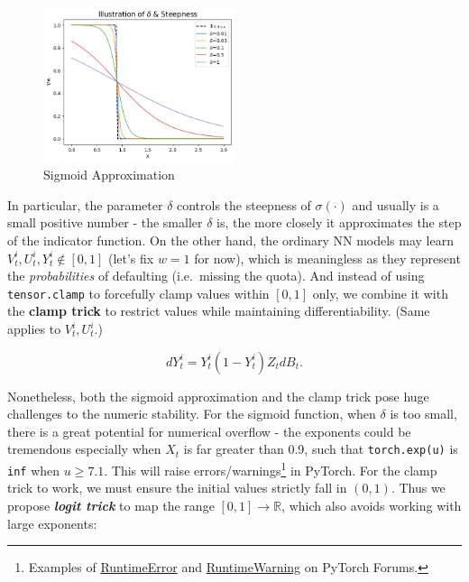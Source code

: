 \documentclass[a4paper,10pt]{article}
\newcommand{\1}{\mathbf{1}}
\begin{document}
\begin{figure}[ht]
    \centering
    \includegraphics[width=0.5\textwidth]{FinalReports/Illustration_diagrams/SigmoidApprox.png}
    \caption{Sigmoid Approximation}
    \label{fig:sig-approx}
\end{figure}

In particular, the parameter \(\delta\) controls the steepness of
\(\sigma(\cdot)\) and usually is a small positive number - the smaller
\(\delta\) is, the more closely it approximates the step of the indicator
function. On the other hand, the ordinary NN models may learn
\(V_t^i,U_t^i,Y_t^i \notin [0,1]\) (let's fix \(w=1\) for now), which is
meaningless as they represent the \emph{probabilities} of defaulting
(i.e.~missing the quota). And instead of using \texttt{tensor.clamp} to
forcefully clamp values within \([0,1]\) only, we combine it with the
\textbf{clamp trick} to restrict values while maintaining
differentiability. (Same applies to \(V_t^i, U_t^i\).)

\begin{equation}\label{dY_tilde}
    dY_t^i=Y_t^i(1-Y_t^i)Z_tdB_t.
\end{equation}

Nonetheless, both the sigmoid approximation and the clamp trick pose
huge challenges to the numeric stability. For the sigmoid function, when
\(\delta\) is too small, there is a great potential for numerical
overflow - the exponents could be tremendous especially when \(X_t\) is
far greater than 0.9, such that \texttt{torch.exp(u)} is \texttt{inf} when
$u \ge 7.1$. This will raise errors/warnings\footnote{Examples of
  \href{https://discuss.pytorch.org/t/second-order-derivative-with-nan-value-runtimeerror-function-sigmoidbackwardbackward0-returned-nan-values-in-its-0th-output/173260}{RuntimeError}
  and
  \href{https://discuss.pytorch.org/t/output-overflow-and-unstablity-when-use-model-eval/3668}{RuntimeWarning}
  on PyTorch Forums.} in PyTorch. For the clamp trick to work, we must ensure the initial values strictly fall in \((0,1)\). Thus we propose \textbf\textit{logit trick} to map the range $[0,1] \to \mathbb{R}$, which
also avoids working with large exponents:
\end{document}
